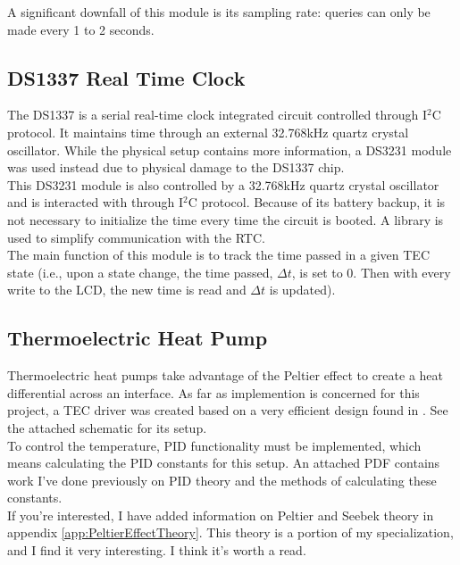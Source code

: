 \documentclass{article}
\begin{document}
\noindent A significant downfall of this module is its sampling rate: queries can only be made every 1 to 2 seconds.


\subsection{DS1337 Real Time Clock}
\label{sec:DS1337}

The DS1337 is a serial real-time clock integrated circuit controlled through I\(^2\)C protocol. It maintains time through an external 32.768kHz quartz crystal oscillator. While the physical setup contains more information, a DS3231 module was used instead due to physical damage to the DS1337 chip.\\

\noindent This DS3231 module is also controlled by a 32.768kHz quartz crystal oscillator and is interacted with through I\(^2\)C protocol. Because of its battery backup, it is not necessary to initialize the time every time the circuit is booted. A library is used to simplify communication with the RTC.\\

\noindent The main function of this module is to track the time passed in a given TEC state (i.e., upon a state change, the time passed, \(\Delta t\), is set to 0. Then with every write to the LCD, the new time is read and \(\Delta t\) is updated).\\


\subsection{Thermoelectric Heat Pump}
\label{sec:TEC}

Thermoelectric heat pumps take advantage of the Peltier effect to create a heat differential across an interface. As far as implemention is concerned for this project, a TEC driver was created based on a very efficient design found in \cite{Albaugh:2001}. See the attached schematic for its setup.\\

\noindent To control the temperature, PID functionality must be implemented, which means calculating the PID constants for this setup. An attached PDF contains work I've done previously on PID theory and the methods of calculating these constants.\\

\noindent If you're interested, I have added information on Peltier and Seebek theory in appendix \ref{app:PeltierEffectTheory}. This theory is a portion of my specialization, and I find it very interesting. I think it's worth a read.\\
\end{document}
